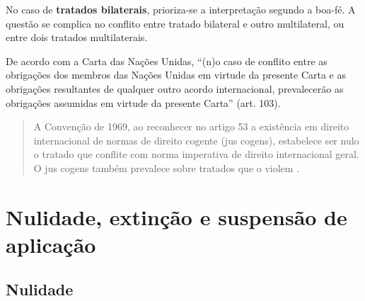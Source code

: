 \documentclass{article}
\begin{document}
No caso de \textbf{tratados bilaterais}, prioriza-se a interpretação segundo a boa-fé. A questão se complica no conflito entre tratado bilateral e outro multilateral, ou entre dois tratados multilaterais.

De acordo com a Carta das Nações Unidas, ``(n)o caso de conflito entre as obrigações dos membros das Nações Unidas em virtude da presente Carta e as obrigações resultantes de qualquer outro acordo internacional, prevalecerão as obrigações assumidas em virtude da presente Carta” (art. 103).

\begin{quote}
    A Convenção de 1969, ao reconhecer no artigo 53 a existência em direito internacional de normas de direito cogente (jus cogens), estabelece ser nulo o tratado que conflite com norma imperativa de direito internacional geral. O jus cogens também prevalece sobre tratados que o violem \cite[p.~165]{accioly_manual_2023}.
\end{quote}

\section{Nulidade, extinção e suspensão de aplicação}

\subsection{Nulidade}
\end{document}
